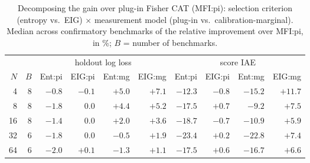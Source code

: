 \begin{table}[tbp]
\centering\footnotesize
\caption{Decomposing the gain over plug-in Fisher CAT (MFI:pi): selection criterion (entropy vs.\ EIG) $\times$ measurement model (plug-in vs.\ calibration-marginal). Median across confirmatory benchmarks of the relative improvement over MFI:pi, in \%; $B$ = number of benchmarks.}
\label{tab:factorial}
\setlength{\tabcolsep}{3.5pt}
\begin{tabular}{@{}rrrrrrrrrr@{}}
\toprule
 & & \multicolumn{4}{c}{holdout log loss} & \multicolumn{4}{c}{score IAE} \\
\cmidrule(lr){3-6}\cmidrule(lr){7-10}
$N$ & $B$ & Ent:pi & EIG:pi & Ent:mg & EIG:mg & Ent:pi & EIG:pi & Ent:mg & EIG:mg \\
\midrule
4 & 8 & $-0.8$ & $-0.1$ & $+5.0$ & $+7.1$ & $-12.3$ & $-0.8$ & $-15.2$ & $+11.7$ \\
8 & 8 & $-1.8$ & $0.0$ & $+4.4$ & $+5.2$ & $-17.5$ & $+0.7$ & $-9.2$ & $+7.5$ \\
16 & 8 & $-1.4$ & $0.0$ & $+2.0$ & $+3.6$ & $-18.7$ & $-0.7$ & $-10.9$ & $+5.9$ \\
32 & 6 & $-1.8$ & $0.0$ & $-0.5$ & $+1.9$ & $-23.4$ & $+0.2$ & $-22.8$ & $+7.4$ \\
64 & 6 & $-2.0$ & $+0.1$ & $-1.3$ & $+1.1$ & $-17.5$ & $+0.6$ & $-16.7$ & $+6.6$ \\
\bottomrule
\end{tabular}
\end{table}
